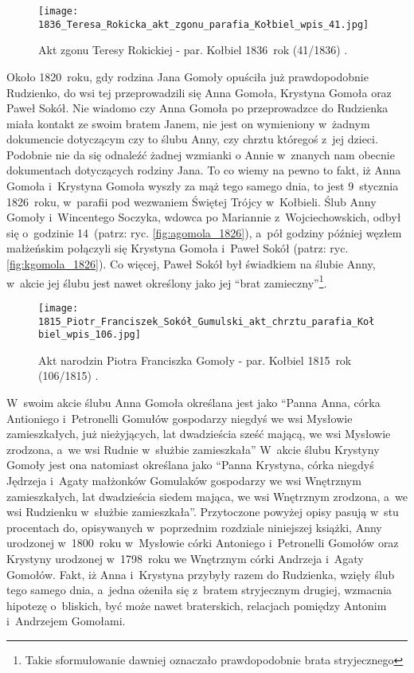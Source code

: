 \begin{figure}[!ht]
    \vspace*{0.5cm}
    \centering \texttt{[image: 
        1836\_Teresa\_Rokicka\_akt\_zgonu\_parafia\_Kołbiel\_wpis\_41.jpg]}
    \captionsetup{format=hang}
    \caption{Akt zgonu Teresy Rokickiej - par. Kołbiel 1836~rok (41/1836) 
    \cite{par_kolbiel1}.}
    \label{fig:trokicka_1836}
\end{figure}

Około 1820~roku, gdy rodzina Jana Gomoły opuściła już prawdopodobnie 
Rudzienko, do wsi tej przeprowadzili się Anna Gomoła, Krystyna Gomoła oraz 
Paweł Sokół. Nie wiadomo czy Anna Gomoła po przeprowadzce do Rudzienka miała 
kontakt ze swoim bratem Janem, nie jest on wymieniony w~żadnym dokumencie 
dotyczącym czy to ślubu Anny, czy chrztu któregoś z~jej dzieci. Podobnie nie 
da się odnaleźć żadnej wzmianki o Annie w~znanych nam obecnie dokumentach 
dotyczących rodziny Jana. To co wiemy na pewno to fakt, iż Anna Gomoła 
i~Krystyna Gomoła wyszły za mąż tego samego dnia, to jest 9~stycznia 
1826~roku, w~parafii pod wezwaniem Świętej Trójcy w~Kołbieli. Ślub Anny 
Gomoły i~Wincentego Soczyka, wdowca po Mariannie z~Wojciechowskich, odbył się 
o~godzinie 14~(patrz: ryc. \ref{fig:agomola_1826}), a~pół godziny później 
węzłem małżeńskim połączyli się Krystyna Gomoła i~Paweł Sokół (patrz: ryc. 
\ref{fig:kgomola_1826}). Co więcej, Paweł Sokół był świadkiem na ślubie Anny, 
w~akcie jej ślubu jest nawet określony jako jej \enquote{brat 
zamieczny}\footnote{Takie sformułowanie dawniej oznaczało prawdopodobnie 
brata stryjecznego}. 

\begin{figure}[!ht]
    \vspace*{0.5cm}
    \centering \texttt{[image: 
        1815\_Piotr\_Franciszek\_Sokół\_Gumulski\_akt\_chrztu\_parafia\_Kołbiel\_wpis\_106.jpg]}
    \captionsetup{format=hang}
    \caption{Akt narodzin Piotra Franciszka Gomoły - par. Kołbiel 1815~rok 
    (106/1815) \cite{par_kolbiel1}.}
    \label{fig:pfgomola_1815}
\end{figure}

W~swoim akcie ślubu Anna Gomoła określana jest jako \enquote{Panna Anna, 
córka Antioniego i~Petronelli Gomułów gospodarzy niegdyś we wsi Mysłowie 
zamieszkałych, już nieżyjących, lat dwadzieścia sześć mającą, we wsi Mysłowie 
zrodzona, a~we wsi Rudnie w~służbie zamieszkała} W~akcie ślubu Krystyny 
Gomoły jest ona natomiast określana jako \enquote{Panna Krystyna, córka 
niegdyś Jędrzeja i~Agaty małżonków Gomulaków gospodarzy we wsi Wnętrznym 
zamieszkałych, lat dwadzieścia siedem mająca, we wsi Wnętrznym zrodzona, a~we 
wsi Rudzienku w~służbie zamieszkała}. Przytoczone powyżej opisy pasują w~stu 
procentach do, opisywanych w~poprzednim rozdziale niniejszej książki, Anny 
urodzonej w~1800~roku w~Mysłowie córki Antoniego i~Petronelli Gomołów oraz 
Krystyny urodzonej w~1798~roku we Wnętrznym córki Andrzeja i~Agaty Gomołów. 
Fakt, iż Anna i~Krystyna przybyły razem do Rudzienka, wzięły ślub tego samego 
dnia, a~jedna ożeniła się z~bratem stryjecznym drugiej, wzmacnia hipotezę 
o~bliskich, być może nawet braterskich, relacjach pomiędzy Antonim 
i~Andrzejem Gomołami.

